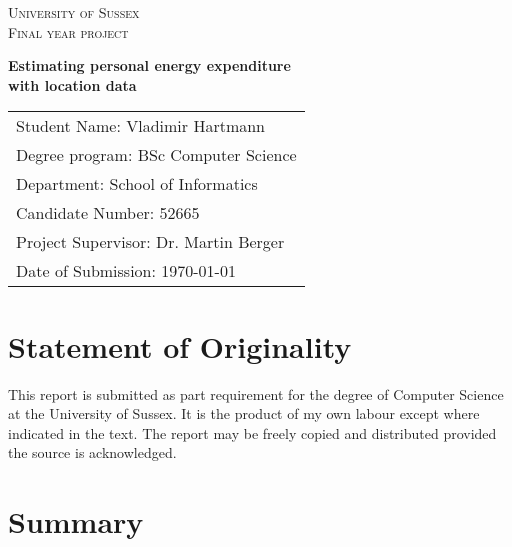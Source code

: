 \documentclass[12pt, a4paper]{report}   %
\begin{document}
\begin{center}

\textsc{\large University of Sussex}\\[1.5cm]
\textsc{Final year project}\\[2cm]

\begin{spacing}{2.5}
{\Large \bfseries Estimating personal energy expenditure \\ with location data}\\[5 cm]
\end{spacing}
\end{center}
\vfill

\begin{spacing}{1.5}
\begin{tabular}{l}
Student Name: Vladimir Hartmann \\
Degree program: BSc Computer Science \\
Department: School of Informatics \\
Candidate Number: 52665 \\
Project Supervisor: Dr. Martin Berger \\
Date of Submission: {\today}
\end{tabular}
\end{spacing}
\thispagestyle{empty}

\section{Statement of Originality}
This report is submitted as part requirement for the degree of Computer Science at the University of Sussex. It is the product of my own labour except where indicated in the text. The report may be freely copied and distributed provided the source is acknowledged.

\section{Summary}

\tableofcontents
\thispagestyle{empty}

\clearpage
{}
\end{document}
